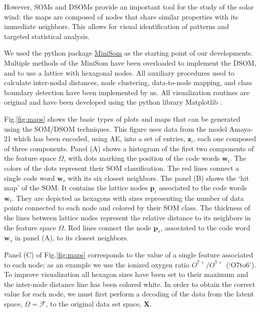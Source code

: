 \documentclass[utf8]{frontiersSCNS} %
\begin{document}
However, SOMs and DSOMs provide an important tool for the study of the solar wind: the maps are composed of nodes that share similar properties with its immediate neighbors. This allows for visual identification of patterns and targeted statistical analysis.

We used the python package \href{https://github.com/JustGlowing/minisom}{MiniSom} \citep{vettigli2013minisom} as the starting point of our developments. Multiple methods of the MiniSom have been overloaded to implement the DSOM, and to use a lattice with hexagonal nodes. All auxiliary procedures used to calculate inter-nodal distances, node clustering, data-to-node mapping, and class boundary detection have been implemented by us. All visualization routines are original and have been developed using the python library Matplotlib \citep{hunter2007matplotlib}.

Fig.\ref{fig:maps} shows the basic types of plots and maps that can be generated using the SOM/DSOM techniques. This figure uses data from the model Amaya-21 which has been encoded, using AE, into a set of entries, $\boldsymbol{z}_i$, each one composed of three components. Panel (A) shows a histogram of the first two components of the feature space $\Omega$, with dots marking the position of the code words $\boldsymbol{w}_i$. The colors of the dots represent their SOM classification. The red lines connect a single code word $\boldsymbol{w}_s$ with its six closest neighbors. The panel (B) shows the `hit map' of the SOM. It contains the lattice nodes $\boldsymbol{p}_i$ associated to the code words $\boldsymbol{w}_i$. They are depicted as hexagons with sizes representing the number of data points connected to each node and colored by their SOM class. The thickness of the lines between lattice nodes represent the relative distance to its neighbors in the feature space $\Omega$. Red lines connect the node $\boldsymbol{p}_s$, associated to the code word $\boldsymbol{w}_s$ in panel (A), to its closest neighbors.

Panel (C) of Fig.\ref{fig:maps} corresponds to the value of a single feature associated to each node; as an example we use the ionized oxygen ratio $O^{7+}/O^{7+}$ (`O7to6'). To improve visualization all hexagon sizes have been set to their maximum and the inter-node distance line has been colored white. In order to obtain the correct value for each node, we must first perform a decoding of the data from the latent space, $\Omega=\boldsymbol{\mathcal{F}}$, to the original data set space, $\boldsymbol{X}$.
\end{document}
